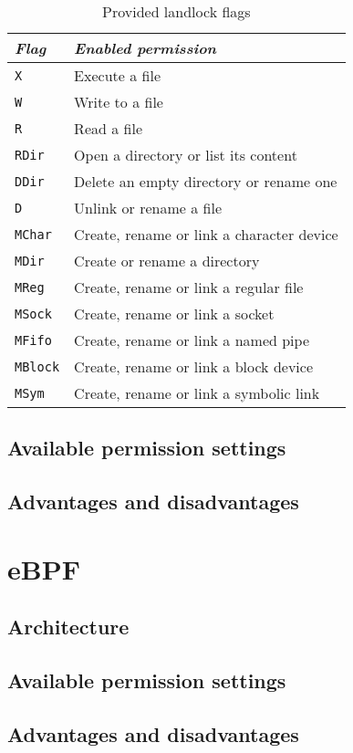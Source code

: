 \begin{table}[h]
  \centering
  \begin{tabular}{|l|l|}
    \hline
    \textit{Flag} & \textit{Enabled permission} \\ \hline\hline
    \texttt{X} & Execute a file \\ \hline
    \texttt{W} & Write to a file \\ \hline
    \texttt{R} & Read a file \\ \hline
    \texttt{RDir} & Open a directory or list its content \\ \hline
    \texttt{DDir} & Delete an empty directory or rename one \\ \hline
    \texttt{D} & Unlink or rename a file \\ \hline
    \texttt{MChar} & Create, rename or link a character device \\ \hline
    \texttt{MDir} & Create or rename a directory \\ \hline
    \texttt{MReg} & Create, rename or link a regular file \\ \hline
    \texttt{MSock} & Create, rename or link a socket \\ \hline
    \texttt{MFifo} & Create, rename or link a named pipe \\ \hline
    \texttt{MBlock} & Create, rename or link a block device \\ \hline
    \texttt{MSym} & Create, rename or link a symbolic link \\ \hline
  \end{tabular}
  \caption{Provided landlock flags}
  \label{table:landlock-flags}
\end{table}

\subsection{Available permission settings}

\subsection{Advantages and disadvantages}

\section{eBPF}

\subsection{Architecture}

\subsection{Available permission settings}

\subsection{Advantages and disadvantages}